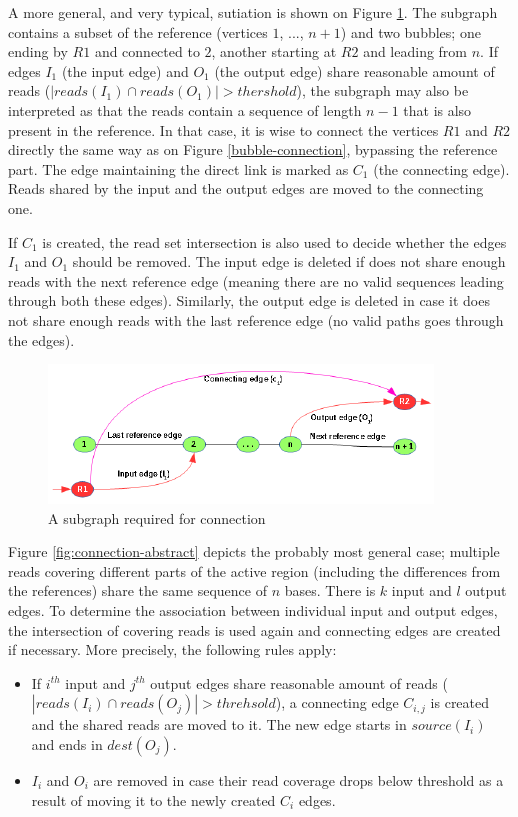 A more general, and very typical, sutiation is shown on Figure \ref{fig:connection-general}. The subgraph contains a subset of the reference (vertices $1$, $...$, $n+1$) and two bubbles; one ending by $R1$ and connected to $2$, another starting at $R2$ and leading from $n$. If edges $I_1$ (the input edge) and $O_1$ (the output edge) share reasonable amount of reads ($|reads(I_1) \cap reads(O_1)| > thershold$), the subgraph may also be interpreted as that the reads contain a sequence of length $n-1$ that is also present in the reference. In that case, it is wise to connect the vertices $R1$ and $R2$ directly the same way as on Figure \ref{bubble-connection}, bypassing the reference part. The edge maintaining the direct link is marked as $C_1$ (the connecting edge). Reads shared by the input and the output edges are moved to the connecting one.

If $C_1$ is created, the read set intersection is also used to decide whether the edges $I_1$ and $O_1$ should be removed. The input edge is deleted if does not share enough reads with the next reference edge (meaning there are no valid sequences leading through both these edges). Similarly, the output edge is deleted in case it does not share enough reads with the last reference edge (no valid paths goes through the edges).

\begin{figure}
	\centering
	\includegraphics{img/connection-general.pdf}
	\caption{A subgraph required for connection}
	\label{fig:connection-general}
\end{figure}

Figure \ref{fig:connection-abstract} depicts the probably most general case; multiple reads covering different parts of the active region (including the differences from the references) share the same sequence of $n$ bases. There is $k$ input and $l$ output edges. To determine the association between individual input and output edges, the intersection of covering reads is used again and connecting edges are created if necessary. More precisely, the following rules apply:
\begin{itemize}
\item If $i^{th}$ input and $j^{th}$ output edges share reasonable amount of reads ($|reads(I_i) \cap reads(O_j)| > threhsold$), a connecting edge $C_{i,j}$ is created and the shared reads are moved to it. The new edge starts in $source(I_i)$ and ends in $dest(O_j)$.
\item $I_i$ and $O_i$ are removed in case their read coverage drops below threshold as a result of moving it to the newly created $C_i$ edges. 
\end{itemize}

